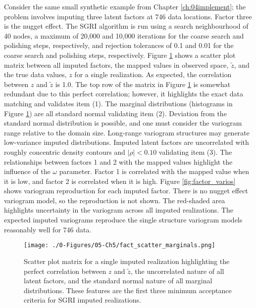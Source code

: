 Consider the same small synthetic example from Chapter \ref{ch:04implement}; the problem involves imputing three latent factors at 746 data locations. Factor three is the nugget effect. The \gls{SGRI} algorithm is run using a search neighbourhood of 40 nodes, a maximum of 20,000 and 10,000 iterations for the coarse search and polishing steps, respectively, and rejection tolerances of 0.1 and 0.01 for the coarse search and polishing steps, respectively. Figure \ref{fig:fact_scatter_marginals} shows a scatter plot matrix between all imputed factors, the mapped values in observed space, $\tilde{z}$, and the true data values, $z$ for a single realization. As expected, the correlation between $z$ and $\tilde{z}$ is 1.0. The top row of the matrix in Figure \ref{fig:fact_scatter_marginals} is somewhat redundant due to this perfect correlation; however, it highlights the exact data matching and validates item (1). The marginal distributions (histograms in Figure \ref{fig:fact_scatter_marginals}) are all standard normal validating item (2). Deviation from the standard normal distribution is possible, and one must consider the variogram range relative to the domain size. Long-range variogram structures may generate low-variance imputed distributions. Imputed latent factors are uncorrelated with roughly concentric density contours and $\lvert \rho \rvert < 0.10$ validating item (3). The relationships between factors 1 and 2 with the mapped values highlight the influence of the $\omega$ parameter. Factor 1 is correlated with the mapped value when it is low, and factor 2 is correlated when it is high. Figure \ref{fig:factor_varios} shows variogram reproduction for each imputed factor. There is no nugget effect variogram model, so the reproduction is not shown. The red-shaded area highlights uncertainty in the variogram across all imputed realizations. The expected imputed variograms reproduce the single structure variogram models reasonably well for 746 data.

\begin{figure}[htb!]
    \centering
    \texttt{[image: ./0-Figures/05-Ch5/fact\_scatter\_marginals.png]}
    \caption{Scatter plot matrix for a single imputed realization highlighting the perfect correlation between $z$ and $\tilde{z}$, the uncorrelated nature of all latent factors, and the standard normal nature of all marginal distributions. These features are the first three minimum acceptance criteria for \gls{SGRI} imputed realizations.}
    \label{fig:fact_scatter_marginals}
\end{figure}

